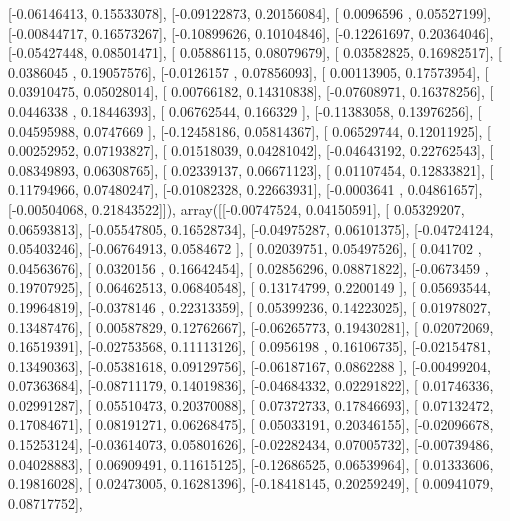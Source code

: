 \documentclass{article}
\begin{document}
       [-0.06146413,  0.15533078],
       [-0.09122873,  0.20156084],
       [ 0.0096596 ,  0.05527199],
       [-0.00844717,  0.16573267],
       [-0.10899626,  0.10104846],
       [-0.12261697,  0.20364046],
       [-0.05427448,  0.08501471],
       [ 0.05886115,  0.08079679],
       [ 0.03582825,  0.16982517],
       [ 0.0386045 ,  0.19057576],
       [-0.0126157 ,  0.07856093],
       [ 0.00113905,  0.17573954],
       [ 0.03910475,  0.05028014],
       [ 0.00766182,  0.14310838],
       [-0.07608971,  0.16378256],
       [ 0.0446338 ,  0.18446393],
       [ 0.06762544,  0.166329  ],
       [-0.11383058,  0.13976256],
       [ 0.04595988,  0.0747669 ],
       [-0.12458186,  0.05814367],
       [ 0.06529744,  0.12011925],
       [ 0.00252952,  0.07193827],
       [ 0.01518039,  0.04281042],
       [-0.04643192,  0.22762543],
       [ 0.08349893,  0.06308765],
       [ 0.02339137,  0.06671123],
       [ 0.01107454,  0.12833821],
       [ 0.11794966,  0.07480247],
       [-0.01082328,  0.22663931],
       [-0.0003641 ,  0.04861657],
       [-0.00504068,  0.21843522]]), array([[-0.00747524,  0.04150591],
       [ 0.05329207,  0.06593813],
       [-0.05547805,  0.16528734],
       [-0.04975287,  0.06101375],
       [-0.04724124,  0.05403246],
       [-0.06764913,  0.0584672 ],
       [ 0.02039751,  0.05497526],
       [ 0.041702  ,  0.04563676],
       [ 0.0320156 ,  0.16642454],
       [ 0.02856296,  0.08871822],
       [-0.0673459 ,  0.19707925],
       [ 0.06462513,  0.06840548],
       [ 0.13174799,  0.2200149 ],
       [ 0.05693544,  0.19964819],
       [-0.0378146 ,  0.22313359],
       [ 0.05399236,  0.14223025],
       [ 0.01978027,  0.13487476],
       [ 0.00587829,  0.12762667],
       [-0.06265773,  0.19430281],
       [ 0.02072069,  0.16519391],
       [-0.02753568,  0.11113126],
       [ 0.0956198 ,  0.16106735],
       [-0.02154781,  0.13490363],
       [-0.05381618,  0.09129756],
       [-0.06187167,  0.0862288 ],
       [-0.00499204,  0.07363684],
       [-0.08711179,  0.14019836],
       [-0.04684332,  0.02291822],
       [ 0.01746336,  0.02991287],
       [ 0.05510473,  0.20370088],
       [ 0.07372733,  0.17846693],
       [ 0.07132472,  0.17084671],
       [ 0.08191271,  0.06268475],
       [ 0.05033191,  0.20346155],
       [-0.02096678,  0.15253124],
       [-0.03614073,  0.05801626],
       [-0.02282434,  0.07005732],
       [-0.00739486,  0.04028883],
       [ 0.06909491,  0.11615125],
       [-0.12686525,  0.06539964],
       [ 0.01333606,  0.19816028],
       [ 0.02473005,  0.16281396],
       [-0.18418145,  0.20259249],
       [ 0.00941079,  0.08717752],
\end{document}
